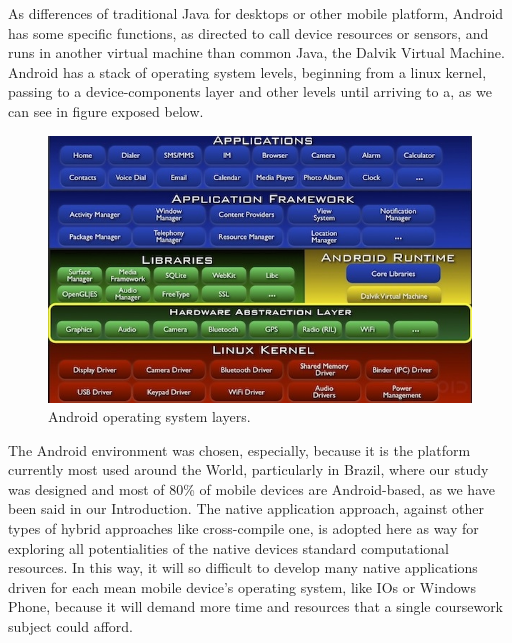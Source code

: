 As differences of traditional Java for desktops or other mobile platform, Android has some specific functions, as directed to call device resources or sensors, and runs in another virtual machine than common Java, the Dalvik Virtual Machine. Android has a stack of operating system levels, beginning from a linux kernel, passing to a device-components layer and other levels until arriving to a, as we can see in figure exposed below.

\begin{figure}[htp]
	\begin{center}
		\includegraphics[scale=1.5]{chapters/desenvolvimento/img/android.png}
		\caption{Android operating system layers.}
		\label{Android-Schema}
	\end{center}
\end{figure}

The Android environment was chosen, especially, because it is the platform currently most used around the World, particularly in Brazil, where our study was designed and most of 80\% of mobile devices are Android-based, as we have been said in our Introduction. The native application approach, against other types of hybrid approaches like cross-compile one, is adopted here as way for exploring all potentialities of the native devices standard computational resources. In this way, it will so difficult to develop many native applications driven for each mean mobile device's operating system, like IOs or Windows Phone, because it will demand more time and resources that a single coursework subject could afford.

